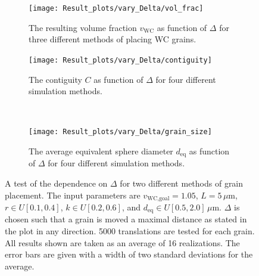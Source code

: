 \documentclass[10pt,a4paper]{article}
\begin{document}
\begin{figure}
	\begin{center}
		\begin{subfigure}[t]{.49\columnwidth}
			\centering
			\texttt{[image: Result\_plots/vary\_Delta/vol\_frac]}
			\caption{The resulting volume fraction $v_\text{WC}$ as function of $\Delta$ for three different methods of placing WC grains.}
			\label{fig:vary_Delta_vol_frac}
		\end{subfigure}
		\begin{subfigure}[t]{.49\columnwidth}
			\centering
			\texttt{[image: Result\_plots/vary\_Delta/contiguity]}
			\caption{The contiguity $C$ as function of $\Delta$ for four different simulation methods.}
			\label{fig:vary_Delta_contiguity}
		\end{subfigure}
		\\
		\begin{subfigure}[t]{.49\columnwidth}
			\centering
			\texttt{[image: Result\_plots/vary\_Delta/grain\_size]}
			\caption{The average equivalent sphere diameter $d_\text{eq}$ as function of $\Delta$ for four different simulation methods.}
			\label{fig:vary_Delta_grain_size}
		\end{subfigure}
		\caption{A test of the dependence on $\Delta$ for two different methods of grain placement. The input parameters are $v_\text{WC,goal} = 1.05$, $L=5 \, \mu\text{m}$, $r \in U[0.1, 0.4]$, $k \in U[0.2, 0.6]$, and $d_\text{eq} \in U[0.5, 2.0] \, \mu\text{m}$. $\Delta$ is chosen such that a grain is moved a maximal distance as stated in the plot in any direction. 5000 translations are tested for each grain. All results shown are taken as an average of 16 realizations. The error bars are given with a width of two standard deviations for the average.}
		\label{fig:vary_Delta}
	\end{center}
\end{figure}
\end{document}
